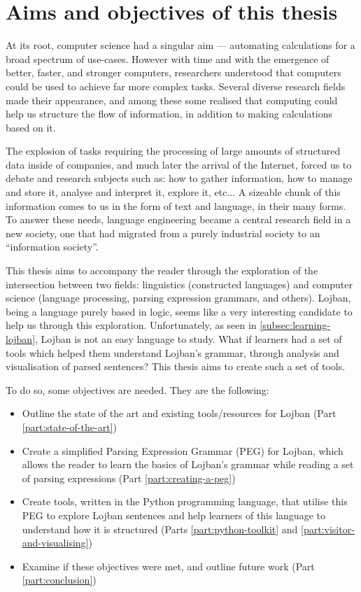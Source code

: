 \chapter{Aims and objectives of this thesis}

\vspace{0.5cm}

At its root, computer science had a singular aim --- automating calculations for a broad spectrum of use-cases.
However with time and with the emergence of better, faster, and stronger computers, researchers understood that computers could be used to achieve
far more complex tasks. Several diverse research fields made their appearance, and among these some realised that computing could help us structure the
flow of information, in addition to making calculations based on it. \newline

The explosion of tasks requiring the processing of large amounts of structured data inside of companies, and much later the arrival of the Internet,
forced us to debate and research subjects such as: how to gather information, how to manage and store it, analyse and interpret it, explore it, etc...
A sizeable chunk of this information comes to us in the form of text and language, in their many forms. To answer these needs, language engineering became a
central research field in a new society, one that had migrated from a purely industrial society to an ``information society''.\newline

This thesis aims to accompany the reader through the exploration of the intersection between two fields: linguistics (constructed languages)
and computer science (language processing, parsing expression grammars, and others). Lojban, being a language purely based in logic, seems like a very
interesting candidate to help us through this exploration. Unfortunately, as seen in \ref{subsec:learning-lojban}, Lojban is not an easy language to study.
What if learners had a set of tools which helped them understand Lojban's grammar, through analysis and visualisation of parsed sentences?
This thesis aims to create such a set of tools.\newline

\newpage

To do so, some objectives are needed. They are the following:
\begin{itemize}
\item Outline the state of the art and existing tools/resources for Lojban (Part \ref{part:state-of-the-art})
\item Create a simplified Parsing Expression Grammar (PEG) for Lojban, which allows the reader to learn the basics of Lojban's grammar
while reading a set of parsing expressions (Part \ref{part:creating-a-peg})
\item Create tools, written in the Python programming language, that utilise this PEG to explore Lojban sentences and help learners of this
language to understand how it is structured (Parts \ref{part:python-toolkit} and \ref{part:visitor-and-visualising})
\item Examine if these objectives were met, and outline future work (Part \ref{part:conclusion})
\end{itemize}